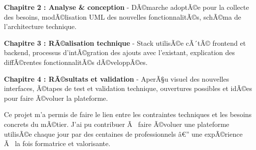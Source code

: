 \documentclass{rapportPFEHIND}
\begin{document}
\textbf{Chapitre 2 : Analyse \& conception} - DÃ©marche adoptÃ©e pour la collecte des besoins, modÃ©lisation UML des nouvelles fonctionnalitÃ©s, schÃ©ma de l'architecture technique.

\textbf{Chapitre 3 : RÃ©alisation technique} - Stack utilisÃ©e cÃ´tÃ© frontend et backend, processus d'intÃ©gration des ajouts avec l'existant, explication des diffÃ©rentes fonctionnalitÃ©s dÃ©veloppÃ©es.

\textbf{Chapitre 4 : RÃ©sultats et validation} - AperÃ§u visuel des nouvelles interfaces, Ã©tapes de test et validation technique, ouvertures possibles et idÃ©es pour faire Ã©voluer la plateforme.

Ce projet m'a permis de faire le lien entre les contraintes techniques et les besoins concrets du mÃ©tier. J'ai pu contribuer Ã  faire Ã©voluer une plateforme utilisÃ©e chaque jour par des centaines de professionnels â€” une expÃ©rience Ã  la fois formatrice et valorisante.






\end{document}
